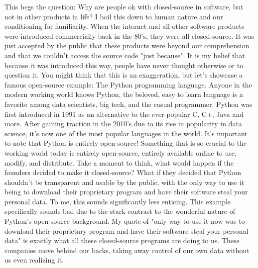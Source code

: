 \documentclass[11pt]{article}
\begin{document}
This begs the question: Why are people ok with closed-source in software, but not in other products in life? I boil this down to human nature and our conditioning for familiarity. When the internet and all other software products were introduced commercially back in the 80's, they were all closed-source. It was just accepted by the public that these products were beyond our comprehension and that we couldn't access the source code "just because". It is my belief that because it was introduced this way, people have never thought otherwise or to question it. You might think that this is an exaggeration, but let's showcase a famous open-source example: The Python programming language. Anyone in the modern working world knows Python, the beloved, easy to learn language is a favorite among data scientists, big tech, and the casual programmer. Python was first introduced in 1991 as an alternative to the ever-popular C, C+, Java and more. After gaining traction in the 2010's due to its rise in popularity in data science, it's now one of the most popular languages in the world. It's important to note that Python is entirely open-source! Something that is so crucial to the working world today is entirely open-source, entirely available online to use, modify, and distribute. Take a moment to think, what would happen if the founders decided to make it closed-source? What if they decided that Python shouldn't be transparent and usable by the public, with the only way to use it being to download their proprietary program and have their software steal your personal data. To me, this sounds significantly less enticing. This example specifically sounds bad due to the stark contrast to the wonderful nature of Python's open-source background. My quote of "only way to use it now was to download their proprietary program and have their software steal your personal data" is exactly what all these closed-source programs are doing to us. These companies move behind our backs, taking away control of our own data without us even realizing it. 
\end{document}
